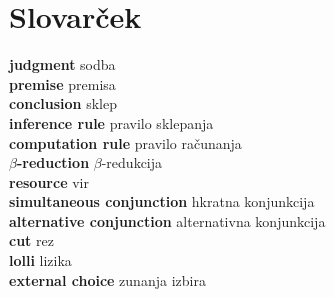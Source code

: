 \documentclass[12pt, titlepage, a4paper]{article}
\newcommand{\geslo}[2]{\textbf{#1} #2 \\}
\begin{document}
\section{Slovarček}

\geslo{judgment}{sodba}
\geslo{premise}{premisa}
\geslo{conclusion}{sklep}
\geslo{inference rule}{pravilo sklepanja}
\geslo{computation rule}{pravilo računanja}
\geslo{\(\beta\)-reduction}{\(\beta\)-redukcija}
\geslo{resource}{vir}
\geslo{simultaneous conjunction}{hkratna konjunkcija}
\geslo{alternative conjunction}{alternativna konjunkcija}
\geslo{cut}{rez}
\geslo{lolli}{lizika}
\geslo{external choice}{zunanja izbira}




\end{document}
